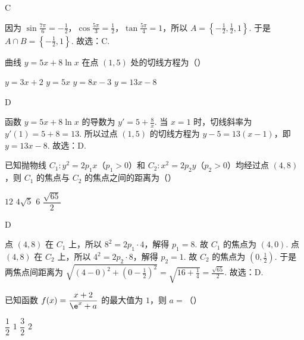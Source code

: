 \documentclass[UTF8,a4paper,oneside,11pt]{ctexbook}
\begin{document}
\begin{answer}
C
\end{answer}

\begin{solution}
因为 \(\sin \frac{7\pi}{6}=-\frac{1}{2}\)，\(\cos \frac{5\pi}{3}=\frac{1}{2}\)，\(\tan \frac{5\pi}{4}=1\)，所以 \(A=\left\{ -\frac{1}{2},\frac{1}{2},1 \right\}\). 于是 \(A\cap B=\left\{ -\frac{1}{2},1 \right\}\). 故选：C.
\end{solution}

\begin{problem}
曲线 \(y=5x+8\ln x\) 在点 \((1,5)\) 处的切线方程为（\quad）

\choices
    {\(y=3x+2\)}
    {\(y=5x\)}
    {\(y=8x-3\)}
    {\(y=13x-8\)}
\end{problem}

\begin{answer}
D
\end{answer}

\begin{solution}
函数 \(y=5x+8\ln x\) 的导数为 \(y'=5+\frac{8}{x}\). 当 \(x=1\) 时，切线斜率为 \(y'(1)=5+8=13\). 所以过点 \((1,5)\) 的切线方程为 \(y-5=13\left( x-1 \right)\)，即 \(y=13x-8\). 故选：D.
\end{solution}

\begin{problem}
已知抛物线 \(C_1:y^2=2p_1x\)（\(p_1>0\)）和 \(C_2:x^2=2p_2y\)（\(p_2>0\)）均经过点 \((4,8)\)，则 \(C_1\) 的焦点与 \(C_2\) 的焦点之间的距离为（\quad）

\choices
    {\(12\)}
    {\(4\sqrt{5}\)}
    {\(6\)}
    {\(\dfrac{\sqrt{65}}{2}\)}
\end{problem}

\begin{answer}
D
\end{answer}

\begin{solution}
点 \((4,8)\) 在 \(C_1\) 上，所以 \(8^2=2p_1\cdot 4\)，解得 \(p_1=8\). 故 \(C_1\) 的焦点为 \(\left( 4,0 \right)\).
点 \((4,8)\) 在 \(C_2\) 上，所以 \(4^2=2p_2\cdot 8\)，解得 \(p_2=1\). 故 \(C_2\) 的焦点为 \(\left( 0,\frac{1}{2} \right)\).
于是两焦点间距离为 \(\sqrt{\left( 4-0 \right)^2+\left( 0-\frac{1}{2} \right)^2}=\sqrt{16+\frac{1}{4}}=\frac{\sqrt{65}}{2}\). 故选：D.
\end{solution}

\begin{problem}
已知函数 \(f(x)=\dfrac{x+2}{\e^x+a}\) 的最大值为 \(1\)，则 \(a=\)（\quad）

\choices
    {\(\dfrac{1}{2}\)}
    {\(1\)}
    {\(\dfrac{3}{2}\)}
    {\(2\)}
\end{problem}
\end{document}

